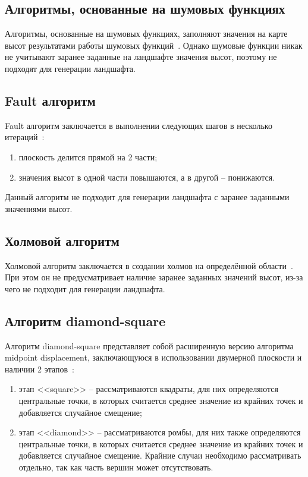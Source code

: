\subsection{Алгоритмы, основанные на шумовых функциях}

Алгоритмы, основанные на шумовых функциях, заполняют значения на карте высот результатами работы шумовых функций~\cite{noises}. Однако шумовые функции никак не учитывают заранее заданные на ландшафте значения высот, поэтому не подходят для генерации ландшафта.

\subsection{Fault алгоритм}

Fault алгоритм заключается в выполнении следующих шагов в несколько итераций~\cite{nohabrinsource}:

\begin{enumerate}[label=\arabic*.]
	\item плоскость делится прямой на 2 части;
	\item значения высот в одной части повышаются, а в другой -- понижаются.
\end{enumerate}

Данный алгоритм не подходит для генерации ландшафта с заранее заданными значениями высот.

\subsection{Холмовой алгоритм}

Холмовой алгоритм заключается в создании холмов на определённой области~\cite{usages}. При этом он не предусматривает наличие заранее заданных значений высот, из-за чего не подходит для генерации ландшафта.

\subsection{Алгоритм diamond-square}

Алгоритм diamond-square представляет собой расширенную версию алгоритма midpoint displacement, заключающуюся в использовании двумерной плоскости и наличии 2 этапов~\cite{ds}:

\begin{enumerate}[label=\arabic*.]
	\item этап <<square>> -- рассматриваются квадраты, для них определяются центральные точки, в которых считается среднее значение из крайних точек и добавляется случайное смещение;
	\item этап <<diamond>> -- рассматриваются ромбы, для них также определяются центральные точки, в которых считается среднее значение из крайних точек и добавляется случайное смещение. Крайние случаи необходимо рассматривать отдельно, так как часть вершин может отсутствовать.
\end{enumerate}

